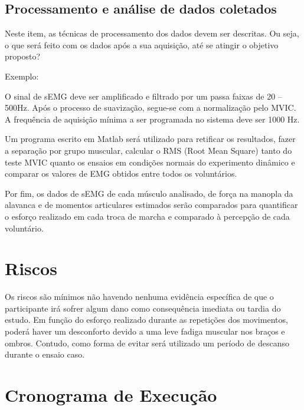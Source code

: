 \documentclass[rascunho,xindy]{Classe-Latex-FEI/fei}
\begin{document}
\section{Processamento e análise de dados coletados}

Neste item, as técnicas de processamento dos dados devem ser descritas. Ou seja, o que será feito com os dados após a sua aquisição, até se atingir o objetivo proposto?

Exemplo:

O sinal de sEMG deve ser amplificado e filtrado por um passa faixas de 20 – 500Hz. Após o processo de suavização, segue-se com a normalização pelo MVIC. A frequência de aquisição mínima a ser programada no sistema deve ser 1000 Hz.

Um programa escrito em Matlab será utilizado para retificar os resultados, fazer a separação por grupo muscular, calcular o RMS (Root Mean Square) tanto do teste MVIC quanto os ensaios em condições normais do experimento dinâmico e comparar os valores de EMG obtidos entre todos os voluntários.

Por fim, os dados de sEMG de cada músculo analisado, de força na manopla da alavanca e de momentos articulares estimados serão comparados para quantificar o esforço realizado em cada troca de marcha e comparado à percepção de cada voluntário.

\chapter{Riscos}

Os riscos são mínimos não havendo nenhuma evidência específica de que o participante irá sofrer algum dano como consequência imediata ou tardia do estudo. Em função do esforço realizado durante as repetições dos movimentos, poderá haver um desconforto devido a uma leve fadiga muscular nos braços e ombros. Contudo, como forma de evitar será utilizado um período de descanso durante o ensaio caso.

\chapter{Cronograma de Execução}
\end{document}
